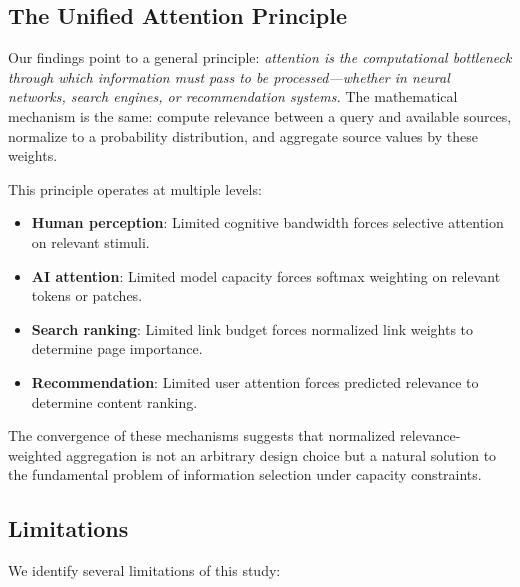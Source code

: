 \subsection{The Unified Attention Principle}

Our findings point to a general principle: \emph{attention is the computational bottleneck through which information must pass to be processed---whether in neural networks, search engines, or recommendation systems.} The mathematical mechanism is the same: compute relevance between a query and available sources, normalize to a probability distribution, and aggregate source values by these weights.

This principle operates at multiple levels:
\begin{itemize}[leftmargin=*,itemsep=2pt,topsep=2pt]
    \item \textbf{Human perception}: Limited cognitive bandwidth forces selective attention on relevant stimuli.
    \item \textbf{AI attention}: Limited model capacity forces softmax weighting on relevant tokens or patches.
    \item \textbf{Search ranking}: Limited link budget forces normalized link weights to determine page importance.
    \item \textbf{Recommendation}: Limited user attention forces predicted relevance to determine content ranking.
\end{itemize}

The convergence of these mechanisms suggests that normalized relevance-weighted aggregation is not an arbitrary design choice but a natural solution to the fundamental problem of information selection under capacity constraints.

\subsection{Limitations}
\label{sec:limitations}

We identify several limitations of this study:


